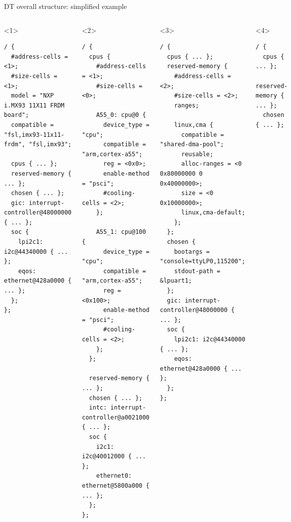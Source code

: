 \begin{frame}[fragile]{DT overall structure: simplified example}
  \begin{columns}
    \begin{onlyenv}<1>
      \begin{block}{}
\begin{verbatim}
/ {
  #address-cells = <1>;
  #size-cells = <1>;
  model = "NXP i.MX93 11X11 FRDM board";
  compatible = "fsl,imx93-11x11-frdm", "fsl,imx93";

  cpus { ... };
  reserved-memory { ... };
  chosen { ... };
  gic: interrupt-controller@48000000 { ... };
  soc {
    lpi2c1: i2c@44340000 { ... };
    eqos: ethernet@428a0000 { ... };
  };
};
\end{verbatim}
      \end{block}
    \end{onlyenv}
    \begin{onlyenv}<2>
      \begin{block}{}
\begin{verbatim}
/ {
  cpus {
    #address-cells = <1>;
    #size-cells = <0>;

    A55_0: cpu@0 {
      device_type = "cpu";
      compatible = "arm,cortex-a55";
      reg = <0x0>;
      enable-method = "psci";
      #cooling-cells = <2>;
    };

    A55_1: cpu@100 {
      device_type = "cpu";
      compatible = "arm,cortex-a55";
      reg = <0x100>;
      enable-method = "psci";
      #cooling-cells = <2>;
    };
  };

  reserved-memory { ... };
  chosen { ... };
  intc: interrupt-controller@a0021000 { ... };
  soc {
    i2c1: i2c@40012000 { ... };
    ethernet0: ethernet@5800a000 { ... };
  };
};
\end{verbatim}
      \end{block}
    \end{onlyenv}
    \begin{onlyenv}<3>
      \begin{block}{}
\begin{verbatim}
/ {
  cpus { ... };
  reserved-memory {
    #address-cells = <2>;
    #size-cells = <2>;
    ranges;

    linux,cma {
      compatible = "shared-dma-pool";
      reusable;
      alloc-ranges = <0 0x80000000 0 0x40000000>;
      size = <0 0x10000000>;
      linux,cma-default;
    };
  };
  chosen {
    bootargs = "console=ttyLP0,115200";
    stdout-path = &lpuart1;
  };
  gic: interrupt-controller@48000000 { ... };
  soc {
    lpi2c1: i2c@44340000 { ... };
    eqos: ethernet@428a0000 { ... };
  };
};
\end{verbatim}
      \end{block}
    \end{onlyenv}
    \begin{onlyenv}<4>
      \begin{block}{}
\begin{verbatim}
/ {
  cpus { ... };
  reserved-memory { ... };
  chosen { ... };


\end{verbatim}
\end{block}
\end{onlyenv}
\end{columns}
\end{frame}
